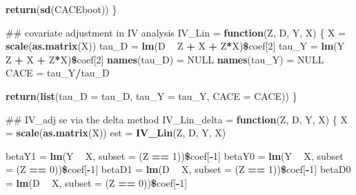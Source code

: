 \documentclass[]{article}
\newenvironment{Shaded}{\begin{snugshade}}{\end{snugshade}}
\newcommand{\KeywordTok}[1]{\textcolor[rgb]{0.13,0.29,0.53}{\textbf{#1}}}
\newcommand{\DataTypeTok}[1]{\textcolor[rgb]{0.13,0.29,0.53}{#1}}
\newcommand{\DecValTok}[1]{\textcolor[rgb]{0.00,0.00,0.81}{#1}}
\newcommand{\StringTok}[1]{\textcolor[rgb]{0.31,0.60,0.02}{#1}}
\newcommand{\OtherTok}[1]{\textcolor[rgb]{0.56,0.35,0.01}{#1}}
\newcommand{\ControlFlowTok}[1]{\textcolor[rgb]{0.13,0.29,0.53}{\textbf{#1}}}
\newcommand{\OperatorTok}[1]{\textcolor[rgb]{0.81,0.36,0.00}{\textbf{#1}}}
\newcommand{\NormalTok}[1]{#1}
\begin{document}
\begin{Shaded}
\begin{Highlighting}[]
       \KeywordTok{return}\NormalTok{(}\KeywordTok{sd}\NormalTok{(CACEboot))}
\NormalTok{\}}

\NormalTok{## covariate adjustment in IV analysis}
\NormalTok{IV_Lin =}\StringTok{ }\ControlFlowTok{function}\NormalTok{(Z, D, Y, X)}
\NormalTok{\{}
\NormalTok{  X     =}\StringTok{ }\KeywordTok{scale}\NormalTok{(}\KeywordTok{as.matrix}\NormalTok{(X))}
\NormalTok{  tau_D =}\StringTok{ }\KeywordTok{lm}\NormalTok{(D }\OperatorTok{~}\StringTok{ }\NormalTok{Z }\OperatorTok{+}\StringTok{ }\NormalTok{X }\OperatorTok{+}\StringTok{ }\NormalTok{Z}\OperatorTok{*}\NormalTok{X)}\OperatorTok{\$}\NormalTok{coef[}\DecValTok{2}\NormalTok{]}
\NormalTok{  tau_Y =}\StringTok{ }\KeywordTok{lm}\NormalTok{(Y }\OperatorTok{~}\StringTok{ }\NormalTok{Z }\OperatorTok{+}\StringTok{ }\NormalTok{X }\OperatorTok{+}\StringTok{ }\NormalTok{Z}\OperatorTok{*}\NormalTok{X)}\OperatorTok{\$}\NormalTok{coef[}\DecValTok{2}\NormalTok{]}
  \KeywordTok{names}\NormalTok{(tau_D) =}\StringTok{ }\OtherTok{NULL}
  \KeywordTok{names}\NormalTok{(tau_Y) =}\StringTok{ }\OtherTok{NULL}
\NormalTok{  CACE  =}\StringTok{ }\NormalTok{tau_Y}\OperatorTok{/}\NormalTok{tau_D}
  
  \KeywordTok{return}\NormalTok{(}\KeywordTok{list}\NormalTok{(}\DataTypeTok{tau_D =}\NormalTok{ tau_D, }\DataTypeTok{tau_Y =}\NormalTok{ tau_Y,}
              \DataTypeTok{CACE  =}\NormalTok{ CACE))}
\NormalTok{\}}

\NormalTok{## IV_adj se via the delta method}
\NormalTok{IV_Lin_delta =}\StringTok{ }\ControlFlowTok{function}\NormalTok{(Z, D, Y, X)}
\NormalTok{\{}
\NormalTok{  X      =}\StringTok{ }\KeywordTok{scale}\NormalTok{(}\KeywordTok{as.matrix}\NormalTok{(X))}
\NormalTok{  est    =}\StringTok{ }\KeywordTok{IV_Lin}\NormalTok{(Z, D, Y, X)}
  
\NormalTok{  betaY1 =}\StringTok{ }\KeywordTok{lm}\NormalTok{(Y }\OperatorTok{~}\StringTok{ }\NormalTok{X, }\DataTypeTok{subset =}\NormalTok{ (Z }\OperatorTok{==}\StringTok{ }\DecValTok{1}\NormalTok{))}\OperatorTok{\$}\NormalTok{coef[}\OperatorTok{-}\DecValTok{1}\NormalTok{]}
\NormalTok{  betaY0 =}\StringTok{ }\KeywordTok{lm}\NormalTok{(Y }\OperatorTok{~}\StringTok{ }\NormalTok{X, }\DataTypeTok{subset =}\NormalTok{ (Z }\OperatorTok{==}\StringTok{ }\DecValTok{0}\NormalTok{))}\OperatorTok{\$}\NormalTok{coef[}\OperatorTok{-}\DecValTok{1}\NormalTok{]}
\NormalTok{  betaD1 =}\StringTok{ }\KeywordTok{lm}\NormalTok{(D }\OperatorTok{~}\StringTok{ }\NormalTok{X, }\DataTypeTok{subset =}\NormalTok{ (Z }\OperatorTok{==}\StringTok{ }\DecValTok{1}\NormalTok{))}\OperatorTok{\$}\NormalTok{coef[}\OperatorTok{-}\DecValTok{1}\NormalTok{]}
\NormalTok{  betaD0 =}\StringTok{ }\KeywordTok{lm}\NormalTok{(D }\OperatorTok{~}\StringTok{ }\NormalTok{X, }\DataTypeTok{subset =}\NormalTok{ (Z }\OperatorTok{==}\StringTok{ }\DecValTok{0}\NormalTok{))}\OperatorTok{\$}\NormalTok{coef[}\OperatorTok{-}\DecValTok{1}\NormalTok{]}
  

\end{Highlighting}
\end{Shaded}
\end{document}
